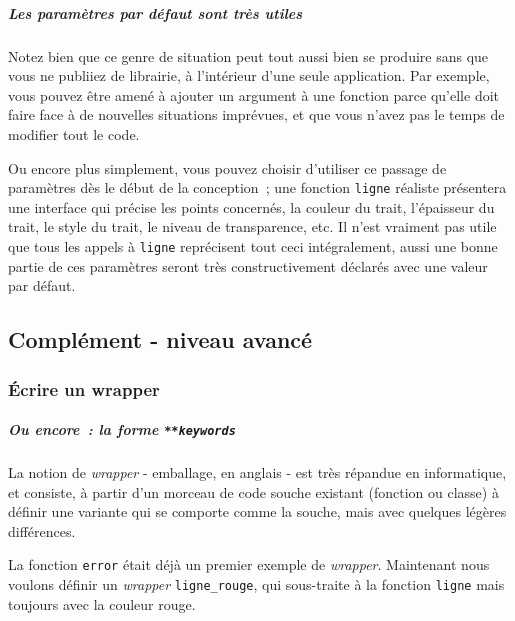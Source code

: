     \hypertarget{les-paramuxe8tres-par-duxe9faut-sont-truxe8s-utiles}{%
\subparagraph{Les paramètres par défaut sont très
utiles}\label{les-paramuxe8tres-par-duxe9faut-sont-truxe8s-utiles}}

    Notez bien que ce genre de situation peut tout aussi bien se produire
sans que vous ne publiiez de librairie, à l'intérieur d'une seule
application. Par exemple, vous pouvez être amené à ajouter un argument à
une fonction parce qu'elle doit faire face à de nouvelles situations
imprévues, et que vous n'avez pas le temps de modifier tout le code.

    Ou encore plus simplement, vous pouvez choisir d'utiliser ce passage de
paramètres dès le début de la conception~; une fonction \texttt{ligne}
réaliste présentera une interface qui précise les points concernés, la
couleur du trait, l'épaisseur du trait, le style du trait, le niveau de
transparence, etc. Il n'est vraiment pas utile que tous les appels à
\texttt{ligne} reprécisent tout ceci intégralement, aussi une bonne
partie de ces paramètres seront très constructivement déclarés avec une
valeur par défaut.

    \hypertarget{compluxe9ment---niveau-avancuxe9}{%
\subsection{Complément - niveau
avancé}\label{compluxe9ment---niveau-avancuxe9}}

    \hypertarget{uxe9crire-un-wrapper}{%
\subsubsection{Écrire un wrapper}\label{uxe9crire-un-wrapper}}

    \hypertarget{ou-encore-la-forme-keywords}{%
\subparagraph{\texorpdfstring{Ou encore~: la forme
\texttt{**keywords}}{Ou encore~: la forme **keywords}}\label{ou-encore-la-forme-keywords}}

    La notion de \emph{wrapper} - emballage, en anglais - est très répandue
en informatique, et consiste, à partir d'un morceau de code souche
existant (fonction ou classe) à définir une variante qui se comporte
comme la souche, mais avec quelques légères différences.

La fonction \texttt{error} était déjà un premier exemple de
\emph{wrapper}. Maintenant nous voulons définir un \emph{wrapper}
\texttt{ligne\_rouge}, qui sous-traite à la fonction \texttt{ligne} mais
toujours avec la couleur rouge.

